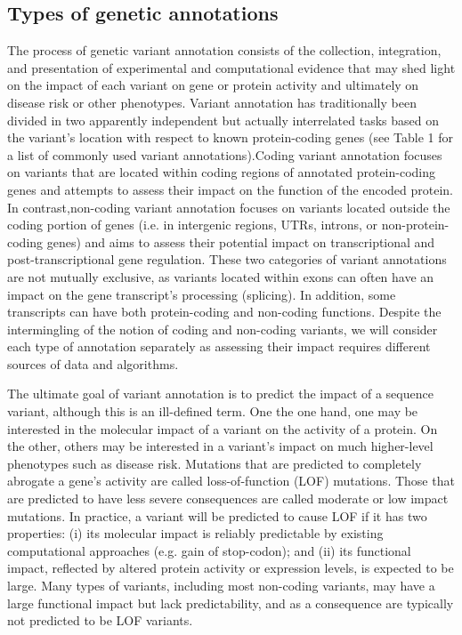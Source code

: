 \subsection{Types of genetic annotations}

The process of genetic variant annotation consists of the collection, integration, and presentation of experimental and computational evidence that may shed light on the impact of each variant on gene or protein activity and ultimately on disease risk or other phenotypes. Variant annotation has traditionally been divided in two apparently independent but actually interrelated tasks based on the variant's location with respect to known protein-coding genes (see Table 1 for a list of commonly used variant annotations).Coding variant annotation focuses on variants that are located within coding regions of annotated protein-coding genes and attempts to assess their impact on the function of the encoded protein. In contrast,non-coding variant annotation focuses on variants located outside the coding portion of genes (i.e. in intergenic regions, UTRs, introns, or non-protein-coding genes) and aims to assess their potential impact on transcriptional and post-transcriptional gene regulation. These two categories of variant annotations are not mutually exclusive, as variants located within exons can often have an impact on the gene transcript's processing (splicing). In addition, some transcripts can have both protein-coding and non-coding functions. Despite the intermingling of the notion of coding and non-coding variants, we will consider each type of annotation separately as assessing their impact requires different sources of data and algorithms.

The ultimate goal of variant annotation is to predict the impact of a sequence variant, although this is an ill-defined term. One the one hand, one may be interested in the molecular impact of a variant on the activity of a protein. On the other, others may be interested in a variant's impact on much higher-level phenotypes such as disease risk. Mutations that are predicted to completely abrogate a gene's activity are called loss-of-function (LOF) mutations. Those that are predicted to have less severe consequences are called moderate or low impact mutations. In practice, a variant will be predicted to cause LOF if it has two properties: (i) its molecular impact is reliably predictable by existing computational approaches (e.g. gain of stop-codon); and (ii) its functional impact, reflected by altered protein activity or expression levels, is expected to be large. Many types of variants, including most non-coding variants, may have a large functional impact but lack predictability, and as a consequence are typically not predicted to be LOF variants.

